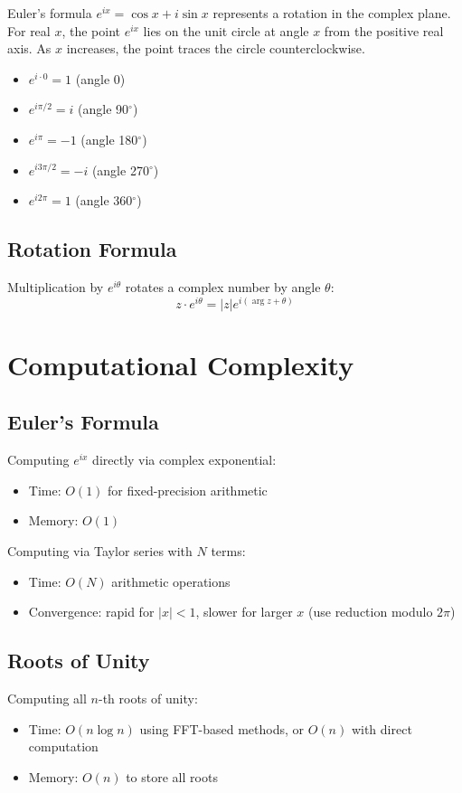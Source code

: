 Euler's formula $e^{ix} = \cos x + i \sin x$ represents a rotation in the complex plane.
For real $x$, the point $e^{ix}$ lies on the unit circle at angle $x$ from the positive
real axis. As $x$ increases, the point traces the circle counterclockwise.

\begin{itemize}
\item $e^{i \cdot 0} = 1$ (angle 0)
\item $e^{i \pi/2} = i$ (angle 90$^\circ$)
\item $e^{i \pi} = -1$ (angle 180$^\circ$)
\item $e^{i 3\pi/2} = -i$ (angle 270$^\circ$)
\item $e^{i 2\pi} = 1$ (angle 360$^\circ$)
\end{itemize}

\subsection{Rotation Formula}

Multiplication by $e^{i\theta}$ rotates a complex number by angle $\theta$:
\[
z \cdot e^{i\theta} = |z| e^{i(\arg z + \theta)}
\]

\section{Computational Complexity}

\subsection{Euler's Formula}
Computing $e^{ix}$ directly via complex exponential:
\begin{itemize}
\item Time: $O(1)$ for fixed-precision arithmetic
\item Memory: $O(1)$
\end{itemize}

Computing via Taylor series with $N$ terms:
\begin{itemize}
\item Time: $O(N)$ arithmetic operations
\item Convergence: rapid for $|x| < 1$, slower for larger $x$ (use reduction modulo $2\pi$)
\end{itemize}

\subsection{Roots of Unity}
Computing all $n$-th roots of unity:
\begin{itemize}
\item Time: $O(n \log n)$ using FFT-based methods, or $O(n)$ with direct computation
\item Memory: $O(n)$ to store all roots
\end{itemize}

